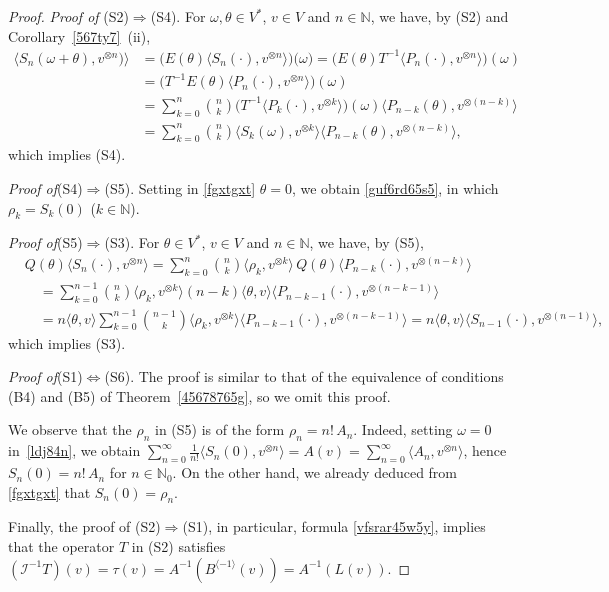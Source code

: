 \documentclass[12pt]{article}
\theoremstyle{remark}
\theoremstyle{remark}
\theoremstyle{remark}
\begin{document}
\begin{proof}
{\it Proof of\/} (S2)$\Rightarrow$(S4). For $\omega, \theta \in V^*$, $v\in V$ and $n\in \mathbb N$, we have, by (S2) and Cor\-ol\-lary~\ref{567ty7}~(ii), 
\begin{align*}
\langle S_n(\omega+\theta), v^{\otimes n})\rangle&=\big(E(\theta)\langle S_n(\cdot), v^{\otimes n}\rangle)\big(\omega)=\big(E(\theta)T^{-1}\langle P_n(\cdot), v^{\otimes n}\rangle\big)(\omega)\\
& =\big(T^{-1}E(\theta)\langle P_n(\cdot), v^{\otimes n}\rangle\big)(\omega)\\
&=\sum_{k=0}^n {n \choose k}\big(T^{-1}\langle P_k(\cdot), v^{\otimes k}\rangle\big)(\omega)\langle P_{n-k}(\theta), v^{\otimes (n-k)}\rangle\\
&=\sum_{k=0}^n {n \choose k}\langle S_k(\omega), v^{\otimes k}\rangle\langle P_{n-k}(\theta), v^{\otimes (n-k)}\rangle,
\end{align*}
which implies (S4). 

{\it Proof of\/}(S4)$\Rightarrow$(S5). Setting in \eqref{fgxtgxt} $\theta=0$, we obtain \eqref{guf6rd65s5}, in which $\rho_k=S_k(0)$ ($k\in\mathbb N$).

{\it Proof of\/}(S5)$\Rightarrow$(S3). For $\theta\in V^*$, $v\in V$ and $n\in \mathbb N$, we have, by (S5),
\begin{align*}
&Q(\theta)\langle S_n(\cdot),v^{\otimes n}\rangle=\sum_{k=0}^n{n \choose k}\langle\rho_k,v^{\otimes k}\rangle\, Q(\theta) \langle P_{n-k}(\cdot),v^{\otimes(n-k)}\rangle\\
&\quad=\sum_{k=0}^{n-1}{n \choose k}\langle\rho_k,v^{\otimes k}\rangle (n-k)\langle\theta,v\rangle \langle P_{n-k-1}(\cdot),v^{\otimes(n-k-1)}\rangle\\
&\quad=n\langle\theta,v\rangle\sum_{k=0}^{n-1}{n-1 \choose k}\langle\rho_k,v^{\otimes k}\rangle  \langle P_{n-k-1}(\cdot),v^{\otimes(n-k-1)}\rangle=n\langle\theta,v\rangle \langle S_{n-1}(\cdot),v^{\otimes(n-1)}\rangle,
\end{align*}
which implies (S3). 

{\it Proof of\/}(S1)$\Leftrightarrow$(S6). The proof is similar to that of the equivalence of conditions (B4) and (B5) of Theorem~\ref{45678765g}, so we omit this proof. 
 
 We observe  that the $\rho_n$ in (S5) is of the form $\rho_n=n!\,A_n$. Indeed, setting $\omega=0$ in~\eqref{ldj84n}, we obtain
$\sum_{n=0}^\infty \frac1{n!}\langle S_n(0),v^{\otimes n}\rangle=A(v)=\sum_{n=0}^\infty \langle A_n,v^{\otimes n}\rangle$, hence $S_n(0)=n!\,A_n$ for $n\in\mathbb N_0$. On the other hand, we already deduced from \eqref{fgxtgxt} that  $S_n(0)=\rho_n$. 

Finally, the proof of (S2)$\Rightarrow$(S1), in particular, formula \eqref{vfsrar45w5y}, implies that the operator $T$ in (S2) satisfies $(\mathcal I^{-1}T)(v)=\tau(v)=A^{-1}(B^{\langle -1\rangle}(v))=A^{-1}(L(v))$.
 \end{proof}
 
\end{document}
